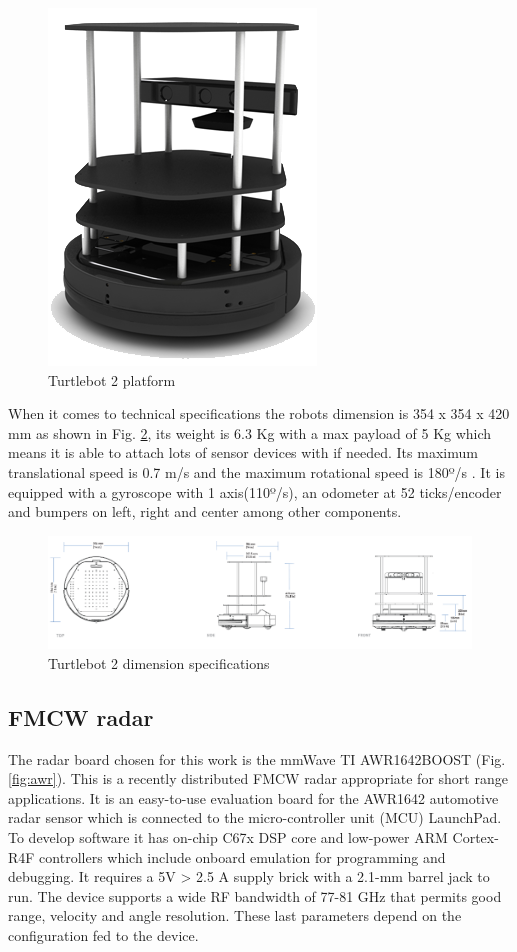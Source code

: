 \begin{figure}[ht!] 
\centerline{\includegraphics [width=0.3 \textwidth]{imgs/chapter4/turtlebot2.png}}
\caption{Turtlebot 2 platform}
\label{fig:t2}
\end{figure}

When it comes to technical specifications the robots dimension is 354 x 354 x 420 mm as shown in Fig. \ref{fig::t2specs}, its weight is 6.3 Kg with a max payload of 5 Kg which means it is able to attach lots of sensor devices with if needed. Its maximum translational  speed is 0.7 m/s and the maximum rotational speed is 180º/s . It is equipped with a gyroscope with 1 axis(110º/s), an odometer at 52 ticks/encoder and  bumpers on left, right and center among other components. 

\begin{figure}[ht!] 
\centerline{\includegraphics [width=1.0 \textwidth]{imgs/chapter4/tspecs.png}}
\caption{Turtlebot 2 dimension specifications}
\label{fig::t2specs}
\end{figure}


\subsection{FMCW radar}
The radar board chosen for this work is the mmWave \ac{TI} AWR1642BOOST (Fig.\ref{fig:awr}). This is a recently distributed \ac{FMCW} radar appropriate for short range applications. It is an easy-to-use evaluation board for the AWR1642 automotive radar sensor which is connected to the micro-controller unit (MCU) LaunchPad. To develop software it has  on-chip C67x DSP core and low-power ARM Cortex-R4F controllers which include onboard emulation for programming and debugging.
It requires a 5V > 2.5 A supply brick with a 2.1-mm barrel jack to run.
The device supports a wide RF bandwidth of 77-81 GHz that permits good range, velocity  and angle resolution. These last parameters depend on the configuration fed to the device.

